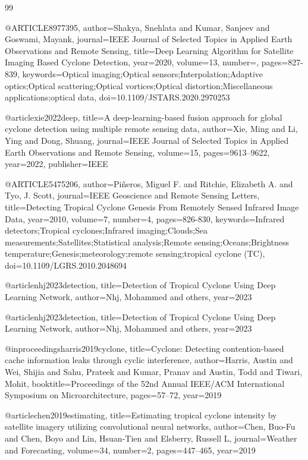 \begin{thebibliography}{99}

@ARTICLE{8977395,
  author={Shakya, Snehlata and Kumar, Sanjeev and Goswami, Mayank},
  journal={IEEE Journal of Selected Topics in Applied Earth Observations and Remote Sensing}, 
  title={Deep Learning Algorithm for Satellite Imaging Based Cyclone Detection}, 
  year={2020},
  volume={13},
  number={},
  pages={827-839},
  keywords={Optical imaging;Optical sensors;Interpolation;Adaptive optics;Optical scattering;Optical vortices;Optical distortion;Miscellaneous applications;optical data},
  doi={10.1109/JSTARS.2020.2970253}}

@article{xie2022deep,
  title={A deep-learning-based fusion approach for global cyclone detection using multiple remote sensing data},
  author={Xie, Ming and Li, Ying and Dong, Shuang},
  journal={IEEE Journal of Selected Topics in Applied Earth Observations and Remote Sensing},
  volume={15},
  pages={9613--9622},
  year={2022},
  publisher={IEEE}
}

@ARTICLE{5475206,
  author={Piñeros, Miguel F. and Ritchie, Elizabeth A. and Tyo, J. Scott},
  journal={IEEE Geoscience and Remote Sensing Letters}, 
  title={Detecting Tropical Cyclone Genesis From Remotely Sensed Infrared Image Data}, 
  year={2010},
  volume={7},
  number={4},
  pages={826-830},
  keywords={Infrared detectors;Tropical cyclones;Infrared imaging;Clouds;Sea measurements;Satellites;Statistical analysis;Remote sensing;Oceans;Brightness temperature;Genesis;meteorology;remote sensing;tropical cyclone (TC)},
  doi={10.1109/LGRS.2010.2048694}}


@article{nhj2023detection,
  title={Detection of Tropical Cyclone Using Deep Learning Network},
  author={Nhj, Mohammed and others},
  year={2023}
}

@article{nhj2023detection,
  title={Detection of Tropical Cyclone Using Deep Learning Network},
  author={Nhj, Mohammed and others},
  year={2023}
}

@inproceedings{harris2019cyclone,
  title={Cyclone: Detecting contention-based cache information leaks through cyclic interference},
  author={Harris, Austin and Wei, Shijia and Sahu, Prateek and Kumar, Pranav and Austin, Todd and Tiwari, Mohit},
  booktitle={Proceedings of the 52nd Annual IEEE/ACM International Symposium on Microarchitecture},
  pages={57--72},
  year={2019}
}

@article{chen2019estimating,
  title={Estimating tropical cyclone intensity by satellite imagery utilizing convolutional neural networks},
  author={Chen, Buo-Fu and Chen, Boyo and Lin, Hsuan-Tien and Elsberry, Russell L},
  journal={Weather and Forecasting},
  volume={34},
  number={2},
  pages={447--465},
  year={2019}
}


\end{thebibliography}
